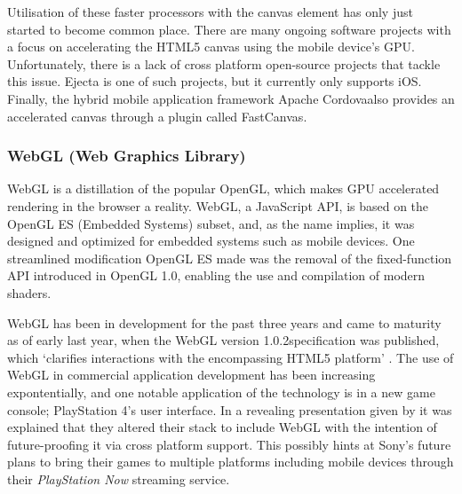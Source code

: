 \documentclass[final]{cmpreport}
\begin{document}
Utilisation of these faster processors with the canvas element has only just started to become common place. There are many ongoing software projects with a focus on accelerating the HTML5 canvas using the mobile device's GPU. Unfortunately, there is a lack of cross platform open-source projects that tackle this issue. Ejecta is one of such projects, but it currently only supports iOS. Finally, the hybrid mobile application framework Apache Cordova\footnotemark[12] also provides an accelerated canvas through a plugin called FastCanvas\footnotemark[13].


\subsubsection{WebGL (Web Graphics Library)}
WebGL is a distillation of the popular OpenGL, which makes GPU accelerated rendering in the browser a reality. WebGL, a JavaScript API, is based on the OpenGL ES (Embedded Systems) subset, and, as the name implies, it was designed and optimized for embedded systems such as mobile devices. One streamlined modification OpenGL ES made was the removal of the fixed-function API introduced in OpenGL 1.0, enabling the use and compilation of modern shaders.

WebGL has been in development for the past three years and came to maturity as of early last year, when the WebGL version 1.0.2\footnotemark[14] specification was published, which `clarifies interactions with the encompassing HTML5 platform' \citep{Verry}. The use of WebGL in commercial application development has been increasing expontentially, and one notable application of the technology is in a new game console; PlayStation 4's user interface. In a revealing presentation given by \citet{Olmstead} it was explained that they altered their stack to include WebGL with the intention of future-proofing it via cross platform support. This possibly hints at Sony's future plans to bring their games to multiple platforms including mobile devices through their \textit{PlayStation Now} streaming service.\footnotemark[15]

\end{document}
